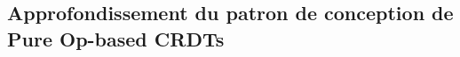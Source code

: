\documentclass[12pt]{thesul}
\theoremstyle{definition}
\begin{document}
\subsection{Approfondissement du patron de conception de Pure Op-based \acp{CRDT}}


% 

% 

% 

% 

% 

% 


\label{app:treedoc-interleaving}
\end{document}
